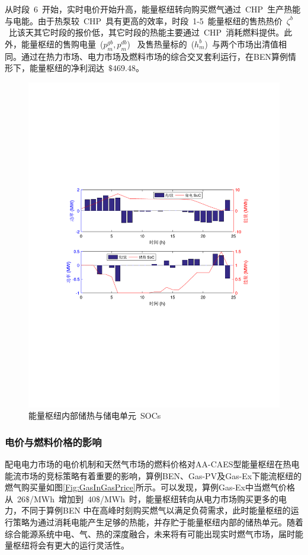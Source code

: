 从时段~6~开始，实时电价开始升高，能量枢纽转向购买燃气通过~CHP~生产热能与电能。由于热泵较~CHP~具有更高的效率，时段~1-5~能量枢纽的售热热价~$\zeta^b$~比该天其它时段的报价低，其它时段的热能主要通过~CHP~消耗燃料提供。此外，能量枢纽的售购电量~($p_{m}^{gb}, p_{m}^{db}$)~ 及售热量标的~($h_{m}^b$)~与两个市场出清值相同。通过在热力市场、电力市场及燃料市场的综合交叉套利运行，在BEN算例情形下，能量枢纽的净利润达~$\$469.48$。
\begin{figure}[!t]
\centering
\includegraphics[scale=0.78]{figures/Chap4-9-ESSTESBAU.pdf}
\caption{能量枢纽内部储热与储电单元~SOCs~}
\label{Fig:ESSTES}
\end{figure}

\subsubsection{电价与燃料价格的影响}
配电电力市场的电价机制和天然气市场的燃料价格对AA-CAES型能量枢纽在热电能流市场的竞标策略有着重要的影响，算例{BEN}、{Gas-PV}及{Gas-Ex}下能流枢纽的燃气购买量如图\ref{Fig:GasInGasPrice}所示。可以发现，算例{Gas-Ex}中当燃气价格从~26$\$$/MWh~增加到~40$\$$/MWh~时，能量枢纽转向从电力市场购买更多的电力，不同于算例{BEN} 中在高峰时刻购买燃气以满足负荷需求，此时能量枢纽的运行策略为通过消耗电能产生足够的热能，并存贮于能量枢纽内部的储热单元。随着综合能源系统中电、气、热的深度融合，未来将有可能出现实时燃气市场，届时能量枢纽将会有更大的运行灵活性。


